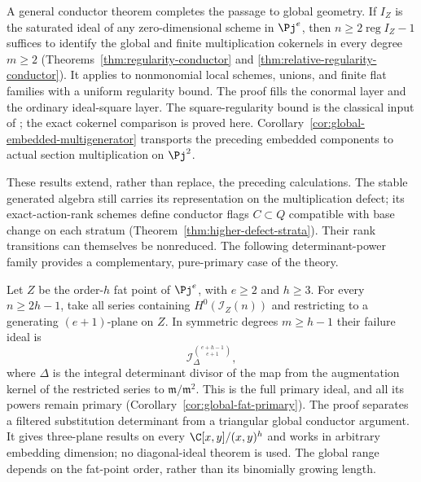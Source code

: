 A general conductor theorem completes the passage to global geometry.
If $I_Z$ is the saturated ideal of any zero-dimensional scheme in
$\Pj^e$, then $n\ge2\operatorname{reg}I_Z-1$ suffices to identify
the global and finite multiplication cokernels in every degree $m\ge2$
(Theorems~\ref{thm:regularity-conductor} and
\ref{thm:relative-regularity-conductor}). It applies to nonmonomial
local schemes, unions, and finite flat families with a uniform
regularity bound. The proof fills the conormal layer and the ordinary
ideal-square layer. The square-regularity bound is the classical
input of \cite[Theorem 1.8]{Sidman}; the exact cokernel comparison
is proved here. Corollary~\ref{cor:global-embedded-multigenerator}
transports the preceding embedded components to actual section
multiplication on $\Pj^2$.

These results extend, rather than replace, the preceding calculations.
The stable generated algebra still carries its representation on the
multiplication defect; its exact-action-rank schemes define conductor
flags $C\subset Q$ compatible with base change on each stratum
(Theorem~\ref{thm:higher-defect-strata}). Their rank transitions can
themselves be nonreduced. The following determinant-power family
provides a complementary, pure-primary case of the theory.

Let $Z$ be the order-$h$ fat point of $\Pj^e$, with $e\ge2$
and $h\ge3$. For every $n\ge2h-1$, take all series containing
$H^0(\mathcal I_Z(n))$ and restricting to a generating $(e+1)$-plane
on $Z$. In symmetric degrees $m\ge h-1$ their failure ideal is
\begin{equation}\label{eq:intro-fat-main}
 \mathcal I_\Delta^{\binom{e+h-1}{e+1}},
\end{equation}
where $\Delta$ is the integral determinant divisor of the map from
the augmentation kernel of the restricted series to
$\mathfrak m/\mathfrak m^2$. This is the full primary ideal, and
all its powers remain primary (Corollary~\ref{cor:global-fat-primary}).
The proof separates a filtered substitution determinant from a
triangular global conductor argument. It gives three-plane results
on every $\C[x,y]/(x,y)^h$ and works in arbitrary embedding dimension;
no diagonal-ideal theorem is used. The global range depends on the
fat-point order, rather than its binomially growing length.


